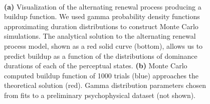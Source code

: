 \documentclass[10pt]{article}
\begin{document}
	
\begin{figure}
	\centering
	
	   \\
	  \vspace{20 pt}
   
 
	
	\caption{\textbf{(a)} Visualization of the alternating renewal process producing a buildup function. We used gamma probability density functions approximating duration distributions to construct Monte Carlo simulations. The analytical solution to the alternating renewal process model, shown as a red solid curve (bottom), allows us to predict buildup as a function of the distributions of dominance durations of each of the perceptual states. \textbf{(b)} Monte Carlo computed buildup function of 1000 trials (blue) approaches the theoretical solution (red). Gamma distribution parameters chosen from fits to a preliminary psychophysical dataset (not shown).}
	\label{fig:makingBUFs}
\end{figure}

\end{document}
